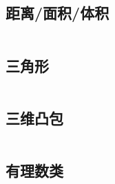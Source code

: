 \documentclass[a4paper,11pt]{article}
\begin{document}
\subsection{距离/面积/体积}
\inputminted[frame=lines,linenos,breaklines]{c++}{3D/DistanceAndArea.cpp}

\subsection{三角形}
\inputminted[frame=lines,linenos,breaklines]{c++}{3D/Triangle.cpp}

\subsection{三维凸包}
\inputminted[frame=lines,linenos,breaklines]{c++}{3D/3DConvexHull.cpp}

\subsection{有理数类}
\inputminted[frame=lines,linenos,breaklines]{c++}{3D/RatStruct.cpp}

\end{document}
